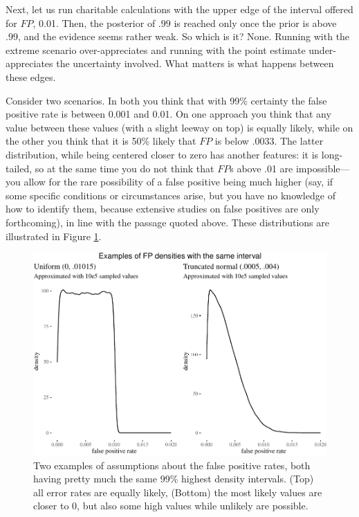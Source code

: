 \documentclass[
  10pt,
  dvipsnames,enabledeprecatedfontcommands]{scrartcl}
\begin{document}
Next, let us run charitable calculations with the upper edge of the
interval offered for \(FP\), 0.01. Then, the posterior of \(.99\) is
reached only once the prior is above .99, and the evidence seems rather
weak. So which is it? None. Running with the extreme scenario
over-appreciates and running with the point estimate under-appreciates
the uncertainty involved. What matters is what happens between these
edges.

Consider two scenarios. In both you think that with 99\% certainty the
false positive rate is between 0.001 and 0.01. On one approach you think
that any value between these values (with a slight leeway on top) is
equally likely, while on the other you think that it is 50\% likely that
\(FP\) is below .0033. The latter distribution, while being centered
closer to zero has another features: it is long-tailed, so at the same
time you do not think that \(FP\)s above .01 are impossible---you allow
for the rare possibility of a false positive being much higher (say, if
some specific conditions or circumstances arise, but you have no
knowledge of how to identify them, because extensive studies on false
positives are only forthcoming), in line with the passage quoted above.
These distributions are illustrated in Figure \ref{fig:fppdistros}.

\begin{figure}[H]



\begin{center}\includegraphics[width=0.8\linewidth]{chapter-outline_files/figure-latex/fig:fppdistros-1} \end{center}


\caption{Two examples of assumptions about the false positive rates, both having pretty much the same 99\% highest density intervals. (Top) all error rates are equally likely, (Bottom) the most likely values are closer to 0, but also some high values while unlikely are possible.}

\label{fig:fppdistros}

\end{figure}
\end{document}
